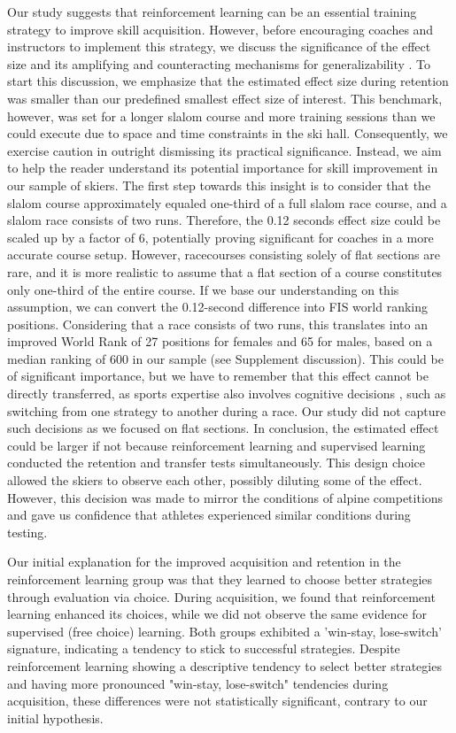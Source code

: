Our study suggests that reinforcement learning can be an essential training strategy to improve skill acquisition. However, before encouraging coaches and instructors to implement this strategy, we discuss the significance of the effect size and its amplifying and counteracting mechanisms for generalizability \cite{anvari_not_2023}. To start this discussion, we emphasize that the estimated effect size during retention was smaller than our predefined smallest effect size of interest. This benchmark, however, was set for a longer slalom course and more training sessions than we could execute due to space and time constraints in the ski hall. Consequently, we exercise caution in outright dismissing its practical significance. Instead, we aim to help the reader understand its potential importance for skill improvement in our sample of skiers. The first step towards this insight is to consider that the slalom course approximately equaled one-third of a full slalom race course, and a slalom race consists of two runs. Therefore, the 0.12 seconds effect size could be scaled up by a factor of 6, potentially proving significant for coaches in a more accurate course setup. However, racecourses consisting solely of flat sections are rare, and it is more realistic to assume that a flat section of a course constitutes only one-third of the entire course. If we base our understanding on this assumption, we can convert the 0.12-second difference into FIS world ranking positions. Considering that a race consists of two runs, this translates into an improved World Rank of 27 positions for females and 65 for males, based on a median ranking of 600 in our sample (see Supplement discussion). This could be of significant importance, but we have to remember that this effect cannot be directly transferred, as sports expertise also involves cognitive decisions \cite{mangalam_investigating_2023, krakauer_motor_2019}, such as switching from one strategy to another during a race. Our study did not capture such decisions as we focused on flat sections. In conclusion, the estimated effect could be larger if not because reinforcement learning and supervised learning conducted the retention and transfer tests simultaneously. This design choice allowed the skiers to observe each other, possibly diluting some of the effect. However, this decision was made to mirror the conditions of alpine competitions and gave us confidence that athletes experienced similar conditions during testing. 

Our initial explanation for the improved acquisition and retention in the reinforcement learning group was that they learned to choose better strategies through evaluation via choice. During acquisition, we found that reinforcement learning enhanced its choices, while we did not observe the same evidence for supervised (free choice) learning. Both groups exhibited a 'win-stay, lose-switch' signature, indicating a tendency to stick to successful strategies. Despite reinforcement learning showing a descriptive tendency to select better strategies and having more pronounced "win-stay, lose-switch" tendencies during acquisition, these differences were not statistically significant, contrary to our initial hypothesis. 



